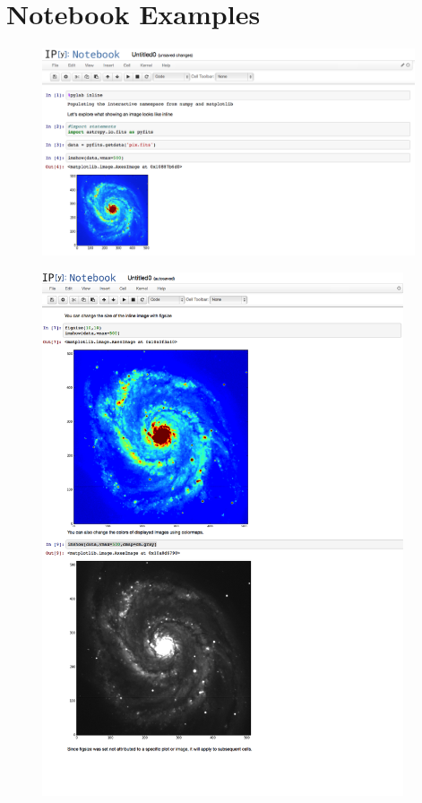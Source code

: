 \section{Notebook Examples}

\begin{figure}[ht!]
  \centering
    \includegraphics[width=0.98\textwidth]{notebook1.png}
\end{figure}

\newpage
\begin{figure}[ht!]
  \centering
    \includegraphics[width=0.95\textwidth]{notebook2.png}
\end{figure}

